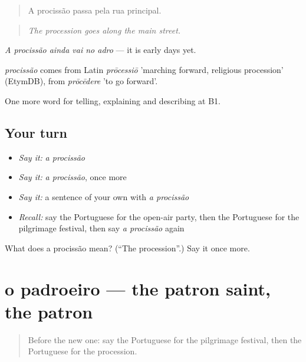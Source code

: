\begin{quote}
A procissão passa pela rua principal.
\end{quote}

\begin{quote}
\emph{The procession goes along the main street.}
\end{quote}

\emph{A procissão ainda vai no adro} — it is early days yet.

\begin{cousinweb}
\emph{procissão} comes from Latin \emph{prōcessiō} 'marching forward, religious procession' (EtymDB), from \emph{prōcēdere} 'to go forward'.
\end{cousinweb}

\begin{grammarlens}[title={What you've built}]
One more word for telling, explaining and describing at B1.
\end{grammarlens}

\subsection*{Your turn}
\begin{itemize}
\raggedright
  \item \emph{Say it:} \emph{a procissão}
  \item \emph{Say it:} \emph{a procissão}, once more
  \item \emph{Say it:} a sentence of your own with \emph{a procissão}
  \item \emph{Recall:} say the Portuguese for the open-air party, then the Portuguese for the pilgrimage festival, then say \emph{a procissão} again
\end{itemize}

\begin{tcolorbox}[breakable,colback=teal!4,colframe=teal!35!black,title={Before you move on}]
What does a procissão mean? (\textquotedblleft{}The procession\textquotedblright{}.) Say it once more.
\end{tcolorbox}
\section[o padroeiro]{o padroeiro — the patron saint, the patron}

\label{lesson:PT-C446-padroeiro}



\begin{quote}
Before the new one: say the Portuguese for the pilgrimage festival, then the Portuguese for the procession.
\end{quote}

